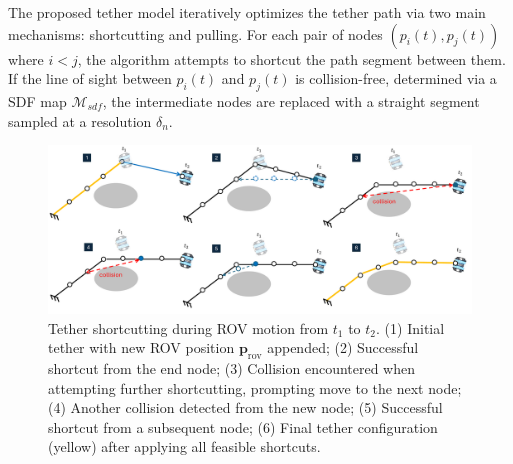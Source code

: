 The proposed tether model iteratively optimizes the tether path via two main mechanisms: shortcutting and pulling. For each pair of nodes \( (p_i(t), p_j(t)) \) where \( i < j \), the algorithm attempts to shortcut the path segment between them. If the line of sight between \( p_i(t) \) and \( p_j(t) \) is collision-free, determined via a \ac{SDF} map \( \mathcal{M}_{sdf} \), the intermediate nodes are replaced with a straight segment sampled at a resolution \( \delta_n \).



\begin{figure}[t!]
    \centering
    \includegraphics[width=1\linewidth]{EA-Planner/figures/tether_model.pdf}
    \caption{Tether shortcutting during \ac{ROV} motion from \( t_1 \) to \( t_2 \). (1) Initial tether with new \ac{ROV} position \( \mathbf{p}_{\text{rov}} \) appended; (2) Successful shortcut from the end node; (3) Collision encountered when attempting further shortcutting, prompting move to the next node; (4) Another collision detected from the new node; (5) Successful shortcut from a subsequent node; (6) Final tether configuration (yellow) after applying all feasible shortcuts.}
    \label{fig:tether}
\end{figure}





